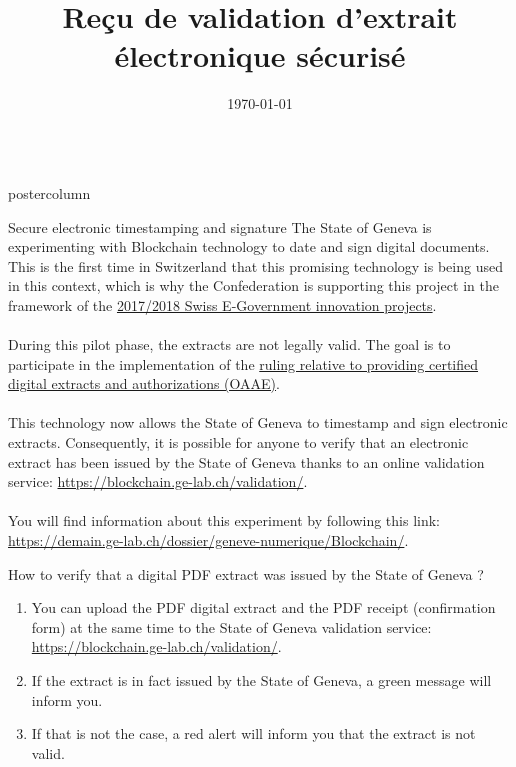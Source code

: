 \documentclass[roundedcorners=true, titleposition=center]{beamerthemeruhuisstijlposter}
\title{Reçu de validation d’extrait électronique sécurisé}
\date{\today}
\begin{document}
\begin{frame}
\begin{columns}
\begin{column}{0.95\textwidth}
\begin{beamercolorbox}[center, wd=\textwidth]{postercolumn}
\begin{minipage}[T]{0.95\textwidth}
\parbox[t][\columnheight]{\textwidth}{%
\begin{block}{Secure electronic timestamping and signature}
The State of Geneva is experimenting with Blockchain technology to date and sign digital documents. This is the first time in Switzerland that this promising technology is being used in this context, which is why the Confederation is supporting this project in the framework of the \href{https://www.egovernment.ch/fr/umsetzung/innovationen/innovations-20172018/}{2017/2018 Swiss E-Government innovation projects}.
\\
\\
During this pilot phase, the extracts are not legally valid. The goal is to participate in the implementation of the \href{https://www.admin.ch/opc/fr/classified-compilation/20111505/201701010000/943.033.pdf}{ruling relative to providing certified digital extracts and authorizations (OAAE)}.
\\
\\
This technology now allows the State of Geneva to timestamp and sign electronic extracts. Consequently, it is possible for anyone to verify that an electronic extract has been issued by the State of Geneva thanks to an online validation service: \href{https://blockchain.ge-lab.ch/validation/}{https://blockchain.ge-lab.ch/validation/}.
\\
\\
You will find information about this experiment by following this link: \href{https://demain.ge-lab.ch/dossier/geneve-numerique/Blockchain/}{https://demain.ge-lab.ch/dossier/geneve-numerique/Blockchain/}.
\end{block}
\medskip
\begin{block}{How to verify that a digital PDF extract was issued by the State of Geneva ?}
\begin{enumerate}
\item You can upload the PDF digital extract and the PDF receipt (confirmation form) at the same time to the State of Geneva validation service: \href{https://blockchain.ge-lab.ch/validation/}{https://blockchain.ge-lab.ch/validation/}.
\item If the extract is in fact issued by the State of Geneva, a green message will inform you.
\item If that is not the case, a red alert will inform you that the extract is not valid.
\end{enumerate}
\end{block}
}
\end{minipage}
\end{beamercolorbox}
\end{column}
\end{columns}
\end{frame}
\end{document}
